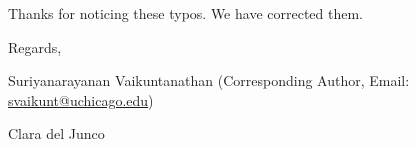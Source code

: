 \documentclass[amsmath, preprintnumbers, 12pt, onecolumn, pre, longbibliograpy]{revtex4-1}
\begin{document}
Thanks for noticing these typos. We have corrected them.



\vspace{2cm}
\noindent Regards,
\vspace{1cm}

\noindent Suriyanarayanan Vaikuntanathan (Corresponding Author, Email: \href{mailto:svaikunt@uchicago.edu}{svaikunt@uchicago.edu})

\noindent Clara del Junco


%
\end{document}
